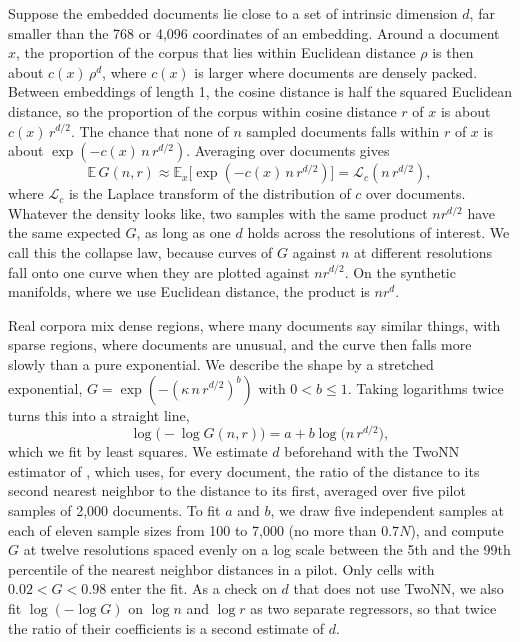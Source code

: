 Suppose the embedded documents lie close to a set of intrinsic dimension $d$, far smaller than the 768 or 4{,}096 coordinates of an embedding. Around a document $x$, the proportion of the corpus that lies within Euclidean distance $\rho$ is then about $c(x)\, \rho^{d}$, where $c(x)$ is larger where documents are densely packed. Between embeddings of length 1, the cosine distance is half the squared Euclidean distance, so the proportion of the corpus within cosine distance $r$ of $x$ is about $c(x)\, r^{d/2}$. The chance that none of $n$ sampled documents falls within $r$ of $x$ is about $\exp(-c(x)\, n\, r^{d/2})$. Averaging over documents gives
\begin{equation}
\mathbb{E}\, G(n, r) \approx \mathbb{E}_{x}\big[\exp(-c(x)\, n\, r^{d/2})\big] = \mathcal{L}_{c}(n\, r^{d/2}),
\end{equation}
where $\mathcal{L}_{c}$ is the Laplace transform of the distribution of $c$ over documents. Whatever the density looks like, two samples with the same product $n r^{d/2}$ have the same expected $G$, as long as one $d$ holds across the resolutions of interest. We call this the collapse law, because curves of $G$ against $n$ at different resolutions fall onto one curve when they are plotted against $n r^{d/2}$. On the synthetic manifolds, where we use Euclidean distance, the product is $n r^{d}$.

Real corpora mix dense regions, where many documents say similar things, with sparse regions, where documents are unusual, and the curve then falls more slowly than a pure exponential. We describe the shape by a stretched exponential, $G = \exp(-(\kappa\, n\, r^{d/2})^{b})$ with $0 < b \le 1$. Taking logarithms twice turns this into a straight line,
\begin{equation}
\log\big(-\log G(n, r)\big) = a + b \log\big(n\,r^{d/2}\big),
\label{eq:collapse}
\end{equation}
which we fit by least squares. We estimate $d$ beforehand with the TwoNN estimator of \citet{facco2017twonn}, which uses, for every document, the ratio of the distance to its second nearest neighbor to the distance to its first, averaged over five pilot samples of 2{,}000 documents. To fit $a$ and $b$, we draw five independent samples at each of eleven sample sizes from 100 to 7{,}000 (no more than $0.7N$), and compute $G$ at twelve resolutions spaced evenly on a log scale between the 5th and the 99th percentile of the nearest neighbor distances in a pilot. Only cells with $0.02 < G < 0.98$ enter the fit. As a check on $d$ that does not use TwoNN, we also fit $\log(-\log G)$ on $\log n$ and $\log r$ as two separate regressors, so that twice the ratio of their coefficients is a second estimate of $d$.

